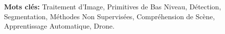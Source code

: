 %
  
\vspace*{\fill}

\textbf{Mots clés:} Traitement d'Image, Primitives de Bas Niveau, Détection, Segmentation, Méthodes Non Supervisées, Compréhension de Scène, Apprentissage Automatique, Drone.